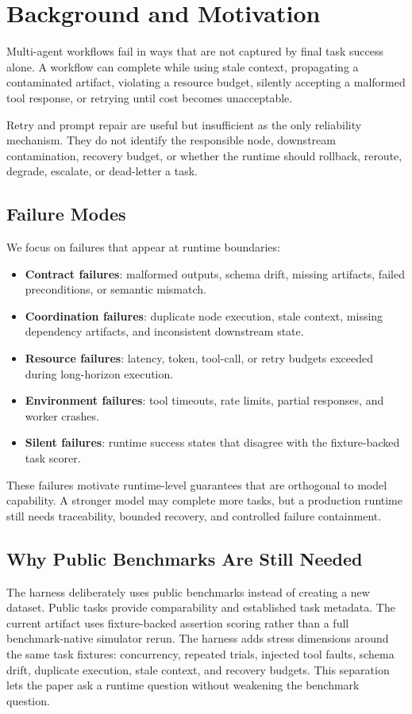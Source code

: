 \section{Background and Motivation}

Multi-agent workflows fail in ways that are not captured by final task success alone. A workflow can complete while using stale context, propagating a contaminated artifact, violating a resource budget, silently accepting a malformed tool response, or retrying until cost becomes unacceptable.

Retry and prompt repair are useful but insufficient as the only reliability mechanism. They do not identify the responsible node, downstream contamination, recovery budget, or whether the runtime should rollback, reroute, degrade, escalate, or dead-letter a task.

\subsection{Failure Modes}

We focus on failures that appear at runtime boundaries:

\begin{itemize}
    \item \textbf{Contract failures}: malformed outputs, schema drift, missing artifacts, failed preconditions, or semantic mismatch.
    \item \textbf{Coordination failures}: duplicate node execution, stale context, missing dependency artifacts, and inconsistent downstream state.
    \item \textbf{Resource failures}: latency, token, tool-call, or retry budgets exceeded during long-horizon execution.
    \item \textbf{Environment failures}: tool timeouts, rate limits, partial responses, and worker crashes.
    \item \textbf{Silent failures}: runtime success states that disagree with the fixture-backed task scorer.
\end{itemize}

These failures motivate runtime-level guarantees that are orthogonal to model capability. A stronger model may complete more tasks, but a production runtime still needs traceability, bounded recovery, and controlled failure containment.

\subsection{Why Public Benchmarks Are Still Needed}

The harness deliberately uses public benchmarks instead of creating a new dataset. Public tasks provide comparability and established task metadata. The current artifact uses fixture-backed assertion scoring rather than a full benchmark-native simulator rerun. The harness adds stress dimensions around the same task fixtures: concurrency, repeated trials, injected tool faults, schema drift, duplicate execution, stale context, and recovery budgets. This separation lets the paper ask a runtime question without weakening the benchmark question.
